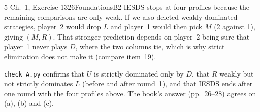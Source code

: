 \begin{exsol}{5}{\MG{} Ch.~1, Exercise 13}{26}{Foundations}{B2}
\interp IESDS stops at four profiles because the remaining comparisons are only weak. If we
also deleted weakly dominated strategies, player~2 would drop $L$ and player~1 would then pick
$M$ (2 against 1), giving $(M,R)$. That stronger prediction depends on player~2 being sure
that player~1 never plays $D$, where the two columns tie, which is why strict elimination does
not make it (compare item~19).

\verify \texttt{check\_A.py} confirms that $U$ is strictly dominated only by $D$, that $R$
weakly but not strictly dominates $L$ (before and after round~1), and that IESDS ends after one
round with the four profiles above. The book's answer (pp.~26--28) agrees on (a), (b) and (c).

\end{exsol}
